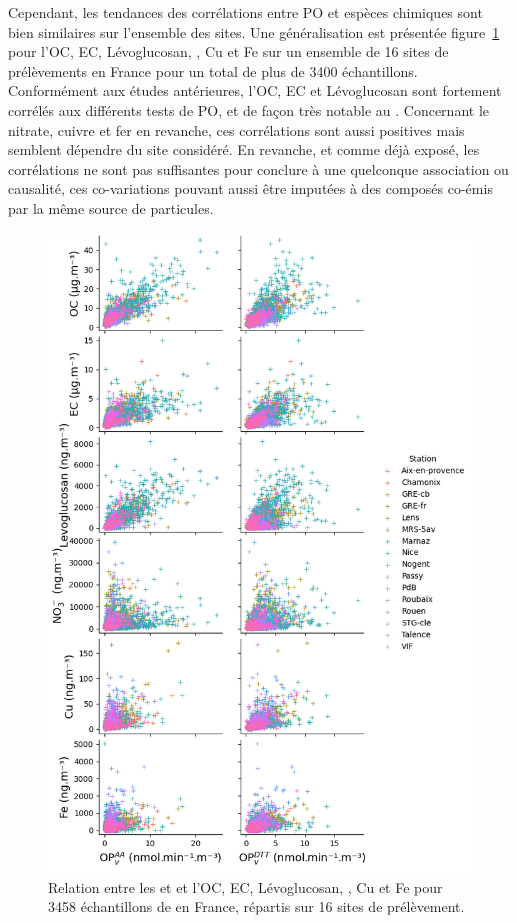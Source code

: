 Cependant, les tendances des corrélations entre PO et espèces chimiques sont bien
similaires sur l'ensemble des sites. Une généralisation est présentée
figure~\ref{fig:pairplotOPs} pour l'OC, EC, Lévoglucosan, \NOt, Cu et Fe sur un ensemble
de 16 sites de prélèvements en France pour un total de plus de 3400 échantillons.
Conformément aux études antérieures, l'OC, EC et Lévoglucosan sont fortement corrélés
aux différents tests de PO, et de façon très notable au \POAAv. Concernant le nitrate, cuivre et fer en revanche, ces
corrélations sont aussi positives mais semblent dépendre du site considéré.
En revanche, et comme déjà exposé, les corrélations ne sont pas suffisantes pour conclure
à une quelconque association ou causalité, ces co-variations pouvant aussi être imputées à des composés co-émis par la même source de particules. 

\begin{figure}[ht]
    \centering
    \includegraphics[width=0.7\linewidth]{figures/chapter04/pairplot_OPs.png}
    \caption{Relation entre les \POAAv{} et \PODTTv{} et l'OC, EC, Lévoglucosan, \NOt, Cu et Fe pour
    3458 échantillons de \PMdix{} en France, répartis sur 16 sites de prélèvement.}%
    \label{fig:pairplotOPs}
\end{figure}

